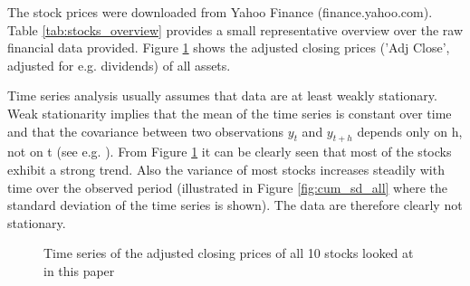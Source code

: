 The stock prices were downloaded from Yahoo Finance (finance.yahoo.com). Table \ref{tab:stocks_overview} provides a small representative overview over the raw financial data provided. Figure \ref{fig:Daily Stock Prices for all Stocks in the Data Set} shows the adjusted closing prices ('Adj Close', adjusted for e.g. dividends) of all assets. 

\begin{table}[h!]
    \centering
    \begin{adjustbox}{width = 0.95\linewidth}
    \setlength{\tabcolsep}{15pt}
    
    \end{adjustbox}
    \caption{}
    \label{tab:stocks_overview}
\end{table}{}

Time series analysis usually assumes that data are at least weakly stationary. Weak stationarity implies that the mean of the time series is constant over time and that the covariance between two observations $y_t$ and $y_{t+h}$ depends only on h, not on t (see e.g. \cite{shumway_time_2011}). From Figure \ref{fig:Daily Stock Prices for all Stocks in the Data Set} it can be clearly seen that most of the stocks exhibit a strong trend. Also the variance of most stocks increases steadily with time over the observed period (illustrated in Figure \ref{fig:cum_sd_all} where the standard deviation of the time series is shown). The data are therefore clearly not stationary. %

\begin{figure}[h!]
    \centering
    \begin{adjustbox}{width=.9\textwidth,center}
    
    \end{adjustbox}  
    \caption{Time series of the adjusted closing prices of all 10 stocks looked at in this paper}
    \label{fig:Daily Stock Prices for all Stocks in the Data Set}
\end{figure}{}

